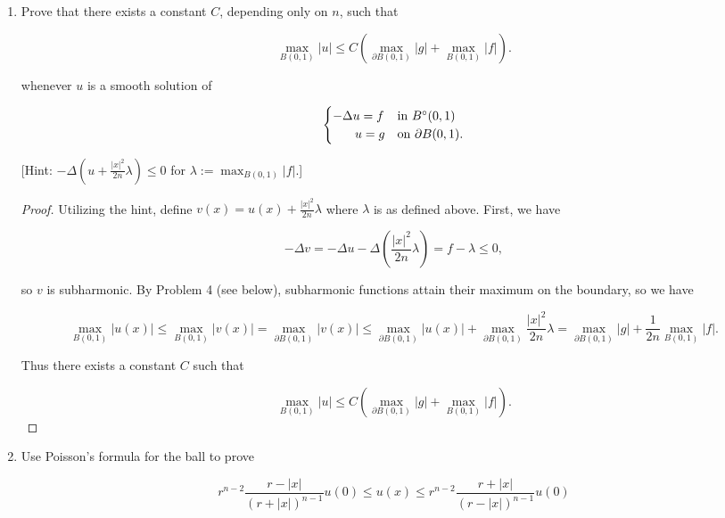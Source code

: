 \documentclass[11pt,oneside,english]{amsart}
\theoremstyle{definition}
\def\Xint#1{\mathchoice
{\XXint\displaystyle\textstyle{#1}}%
{\XXint\textstyle\scriptstyle{#1}}%
{\XXint\scriptstyle\scriptscriptstyle{#1}}%
{\XXint\scriptscriptstyle\scriptscriptstyle{#1}}%
\!\int}
\def\XXint#1#2#3{{\setbox0=\hbox{$#1{#2#3}{\int}$ }
\vcenter{\hbox{$#2#3$ }}\kern-.6\wd0}}
\def\dashint{\Xint-}
\begin{document}
\begin{enumerate}
\begin{proof}
so

\[
u(0)=\dashint_{\partial B(0,r)}g\,dS+\frac{1}{n(n-2)\alpha(n)}\int_{B(0,r)}\left(\frac{1}{|x|^{n-2}}-\frac{1}{r^{n-2}}\right) f\,dx\\[2mm]
\]

as required.
\end{proof}

\vfill
\pagebreak




\setcounter{enumi}{4}

\item Prove that there exists a constant $C$, depending only on $n$, such that

\[
\max_{B(0,1)}|u|\leq C\left(\max_{\partial B(0,1)}|g|+\max_{B(0,1)}|f|\right).
\]

whenever $u$ is a smooth solution of

\[
\begin{cases}-\Delta u=f & \text{in }B^\circ(0,1)\\ \hspace{6.25mm}u=g & \text{on }\partial B(0,1).\end{cases}
\]

[Hint: $-\Delta(u+\frac{|x|^2}{2n}\lambda)\leq0$ for $\lambda:=\max_{B(0,1)}|f|$.]
\begin{proof}
Utilizing the hint, define $v(x)=u(x)+\frac{|x|^2}{2n}\lambda$ where $\lambda$ is as defined above. First, we have

\[
-\Delta v=-\Delta u-\Delta\left(\frac{|x|^2}{2n}\lambda\right)=f-\lambda\leq0,
\]

so $v$ is subharmonic. By Problem 4 (see below), subharmonic functions attain their maximum on the boundary, so we have

\[
\max_{B(0,1)}|u(x)|\leq\max_{B(0,1)}|v(x)|=\max_{\partial B(0,1)}|v(x)|\leq\max_{\partial B(0,1)}|u(x)|+\max_{\partial B(0,1)}\frac{|x|^2}{2n}\lambda=\max_{\partial B(0,1)}|g|+\frac{1}{2n}\max_{B(0,1)}|f|.
\]

Thus there exists a constant $C$ such that 

\[
\max_{B(0,1)}|u|\leq C\left(\max_{\partial B(0,1)}|g|+\max_{B(0,1)}|f|\right).
\]
\end{proof}

\pagebreak

\item Use Poisson's formula for the ball to prove

\[
r^{n-2}\frac{r-|x|}{(r+|x|)^{n-1}}u(0)\leq u(x)\leq r^{n-2}\frac{r+|x|}{(r-|x|)^{n-1}}u(0)
\]


\end{enumerate}
\end{document}
